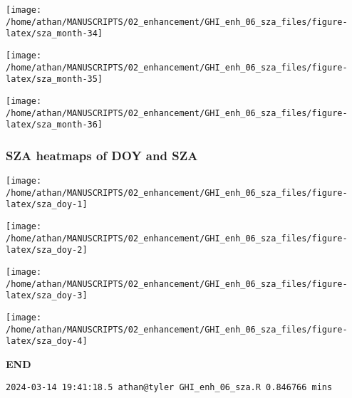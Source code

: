 \documentclass[
  10pt,
  a4paper,oneside]{article}
\begin{document}
\begin{center}\texttt{[image: /home/athan/MANUSCRIPTS/02\_enhancement/GHI\_enh\_06\_sza\_files/figure-latex/sza\_month-34]} \end{center}

\begin{center}\texttt{[image: /home/athan/MANUSCRIPTS/02\_enhancement/GHI\_enh\_06\_sza\_files/figure-latex/sza\_month-35]} \end{center}

\begin{center}\texttt{[image: /home/athan/MANUSCRIPTS/02\_enhancement/GHI\_enh\_06\_sza\_files/figure-latex/sza\_month-36]} \end{center}

\newpage
\FloatBarrier

\hypertarget{sza-heatmaps-of-doy-and-sza}{%
\subsubsection{SZA heatmaps of DOY and SZA}\label{sza-heatmaps-of-doy-and-sza}}

\begin{center}\texttt{[image: /home/athan/MANUSCRIPTS/02\_enhancement/GHI\_enh\_06\_sza\_files/figure-latex/sza\_doy-1]} \end{center}

\begin{center}\texttt{[image: /home/athan/MANUSCRIPTS/02\_enhancement/GHI\_enh\_06\_sza\_files/figure-latex/sza\_doy-2]} \end{center}

\begin{center}\texttt{[image: /home/athan/MANUSCRIPTS/02\_enhancement/GHI\_enh\_06\_sza\_files/figure-latex/sza\_doy-3]} \end{center}

\begin{center}\texttt{[image: /home/athan/MANUSCRIPTS/02\_enhancement/GHI\_enh\_06\_sza\_files/figure-latex/sza\_doy-4]} \end{center}

\textbf{END}

\begin{verbatim}
2024-03-14 19:41:18.5 athan@tyler GHI_enh_06_sza.R 0.846766 mins
\end{verbatim}
\end{document}
